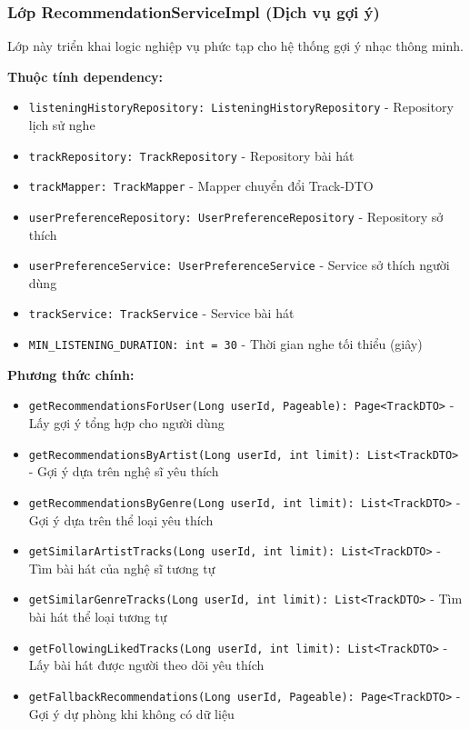 \subsubsection{Lớp RecommendationServiceImpl (Dịch vụ gợi ý)}

Lớp này triển khai logic nghiệp vụ phức tạp cho hệ thống gợi ý nhạc thông minh.

\textbf{Thuộc tính dependency:}
\begin{itemize}
    \item \texttt{listeningHistoryRepository: ListeningHistoryRepository} - Repository lịch sử nghe
    \item \texttt{trackRepository: TrackRepository} - Repository bài hát
    \item \texttt{trackMapper: TrackMapper} - Mapper chuyển đổi Track-DTO
    \item \texttt{userPreferenceRepository: UserPreferenceRepository} - Repository sở thích
    \item \texttt{userPreferenceService: UserPreferenceService} - Service sở thích người dùng
    \item \texttt{trackService: TrackService} - Service bài hát
    \item \texttt{MIN\_LISTENING\_DURATION: int = 30} - Thời gian nghe tối thiểu (giây)
\end{itemize}

\textbf{Phương thức chính:}
\begin{itemize}
    \item \texttt{getRecommendationsForUser(Long userId, Pageable): Page<TrackDTO>} - Lấy gợi ý tổng hợp cho người dùng
    \item \texttt{getRecommendationsByArtist(Long userId, int limit): List<TrackDTO>} - Gợi ý dựa trên nghệ sĩ yêu thích
    \item \texttt{getRecommendationsByGenre(Long userId, int limit): List<TrackDTO>} - Gợi ý dựa trên thể loại yêu thích
    \item \texttt{getSimilarArtistTracks(Long userId, int limit): List<TrackDTO>} - Tìm bài hát của nghệ sĩ tương tự
    \item \texttt{getSimilarGenreTracks(Long userId, int limit): List<TrackDTO>} - Tìm bài hát thể loại tương tự
    \item \texttt{getFollowingLikedTracks(Long userId, int limit): List<TrackDTO>} - Lấy bài hát được người theo dõi yêu thích
    \item \texttt{getFallbackRecommendations(Long userId, Pageable): Page<TrackDTO>} - Gợi ý dự phòng khi không có dữ liệu
\end{itemize}

